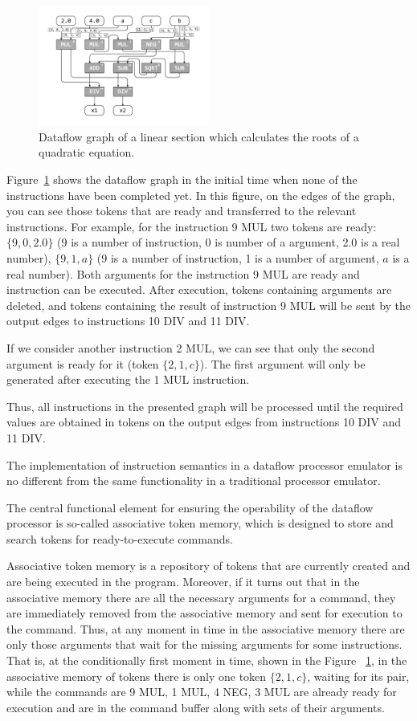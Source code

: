 \documentclass[
11pt,%
tightenlines,%
twoside,%
onecolumn,%
nofloats,%
nobibnotes,%
nofootinbib,%
superscriptaddress,%
noshowpacs,%
centertags]%
{revtex4}
\begin{document}
\begin{figure}[h]
\includegraphics[width=0.5\textwidth]{pics/dataflow.pdf}
\caption{Dataflow graph of a linear section which calculates the roots of a quadratic equation.}\label{fig:dataflow}
\end{figure}

Figure~\ref{fig:dataflow} shows the dataflow graph in the initial time when none of the instructions have been completed yet.
In this figure, on the edges of the graph, you can see those tokens that are ready and transferred to the relevant instructions.
For example, for the instruction 9 MUL two tokens are ready: $\{9, 0, 2.0\}$ (9 is a number of instruction, 0 is number of a argument, 2.0 is a real number), $\{9, 1, a\}$ (9 is a number of instruction, 1 is a number of argument, $a$ is a real number).
Both arguments for the instruction 9 MUL are ready and instruction can be executed.
After execution, tokens containing arguments are deleted, and tokens containing the result of instruction 9 MUL will be sent by the output edges to instructions 10 DIV and 11 DIV.

If we consider another instruction 2 MUL, we can see that only the second argument is ready for it (token $\{2, 1, c\}$).
The first argument will only be generated after executing the 1 MUL instruction.

Thus, all instructions in the presented graph will be processed until the required values are obtained in tokens on the output edges from instructions 10 DIV and 11 DIV.

The implementation of instruction semantics in a dataflow processor emulator is no different from the same functionality in a traditional processor emulator.

The central functional element for ensuring the operability of the dataflow processor is so-called associative token memory, which is designed to store and search tokens for ready-to-execute commands.

Associative token memory is a repository of tokens that are
currently created and are being executed in the program. Moreover,
if it turns out that in the associative memory there are all the
necessary arguments for a command, they are immediately removed from
the associative memory and sent for execution to the command. Thus,
at any moment in time in the associative memory there are only those
arguments that wait for the missing arguments for some instructions.
That is, at the conditionally first moment in time, shown in the
Figure~ \ref{fig:dataflow}, in the associative memory of tokens
there is only one token $\{2, 1, c\}$, waiting for its pair, while
the commands are 9 MUL, 1 MUL, 4 NEG, 3 MUL are already ready for
execution and are in the command buffer along with sets of their
arguments.
\end{document}
